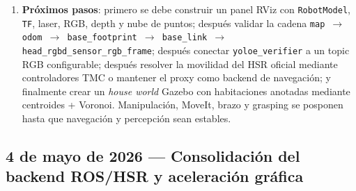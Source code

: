 \documentclass[11pt,a4paper]{article}
\begin{document}
\begin{enumerate}
        \texttt{/hsrb/head\_rgbd\_sensor/depth\_registered/image\_rect\_raw},
        \texttt{/hsrb/head\_rgbd\_sensor/rgb/camera\_info},
        \texttt{/hsrb/head\_rgbd\_sensor/depth\_registered/camera\_info} y
        \texttt{/hsrb/head\_rgbd\_sensor/depth\_registered/rectified\_points}.
        El siguiente checkpoint técnico no es mover todavía el robot físico,
        sino visualizar y validar estos topics en RViz.
  \item \textbf{Próximos pasos}: primero se debe construir un panel RViz con
        \texttt{RobotModel}, \texttt{TF}, laser, RGB, depth y nube de puntos;
        después validar la cadena \texttt{map $\rightarrow$ odom
        $\rightarrow$ base\_footprint $\rightarrow$ base\_link
        $\rightarrow$ head\_rgbd\_sensor\_rgb\_frame}; después conectar
        \texttt{yoloe\_verifier} a un topic RGB configurable; después resolver
        la movilidad del HSR oficial mediante controladores TMC o mantener el
        proxy como backend de navegación; y finalmente crear un \emph{house
        world} Gazebo con habitaciones anotadas mediante centroides + Voronoi.
        Manipulación, MoveIt, brazo y grasping se posponen hasta que navegación
        y percepción sean estables.
\end{enumerate}

\subsection*{4 de mayo de 2026 --- Consolidación del backend ROS/HSR y aceleración gráfica}
\end{document}
